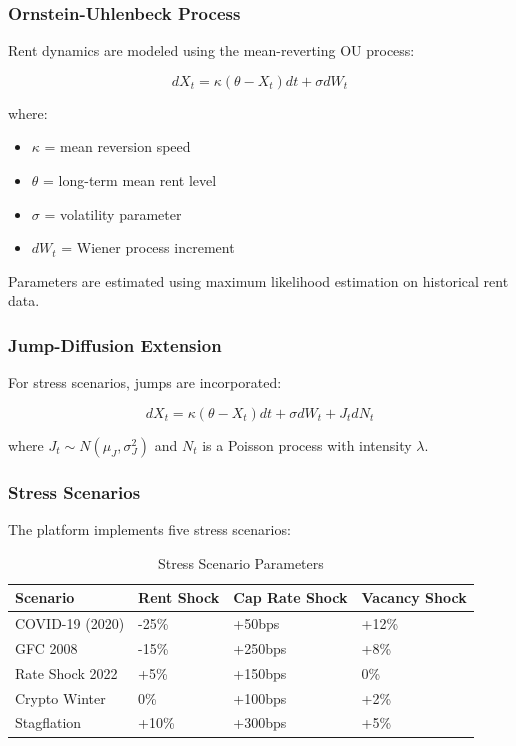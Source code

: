 ﻿\documentclass[12pt]{article}
\begin{document}
\subsubsection{Ornstein-Uhlenbeck Process}

Rent dynamics are modeled using the mean-reverting OU process:

\begin{equation}
dX_t = \kappa(\theta - X_t)dt + \sigma dW_t
\label{eq:ou}
\end{equation}

where:
\begin{itemize}
    \item $\kappa$ = mean reversion speed
    \item $\theta$ = long-term mean rent level
    \item $\sigma$ = volatility parameter
    \item $dW_t$ = Wiener process increment
\end{itemize}

Parameters are estimated using maximum likelihood estimation on historical rent data.

\subsubsection{Jump-Diffusion Extension}

For stress scenarios, jumps are incorporated:

\begin{equation}
dX_t = \kappa(\theta - X_t)dt + \sigma dW_t + J_t dN_t
\label{eq:jump}
\end{equation}

where $J_t \sim N(\mu_J, \sigma_J^2)$ and $N_t$ is a Poisson process with intensity $\lambda$.

\subsubsection{Stress Scenarios}

The platform implements five stress scenarios:

\begin{table}[H]
\centering
\caption{Stress Scenario Parameters}
\label{tab:stress}
\begin{tabular}{@{}llll@{}}
\toprule
\textbf{Scenario} & \textbf{Rent Shock} & \textbf{Cap Rate Shock} & \textbf{Vacancy Shock} \\
\midrule
COVID-19 (2020) & -25\% & +50bps & +12\% \\
GFC 2008 & -15\% & +250bps & +8\% \\
Rate Shock 2022 & +5\% & +150bps & 0\% \\
Crypto Winter & 0\% & +100bps & +2\% \\
Stagflation & +10\% & +300bps & +5\% \\
\bottomrule
\end{tabular}
\end{table}
\end{document}
